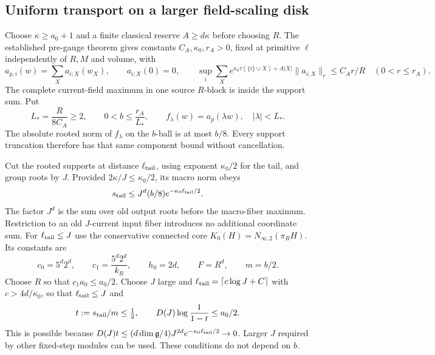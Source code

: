 \documentclass[11pt]{article}
\theoremstyle{remark}
\begin{document}
\subsection{Uniform transport on a larger field-scaling disk}
\label{cdh-scaling-section}

Choose $\kappa\geq a_0+1$ and a finite classical reserve
$A\geq d\kappa$ before choosing $R$. The established pre-gauge
theorem gives constants $C_A,\kappa_0,r_A>0$, fixed at primitive
$\ell$ independently of $R,M$ and volume, with
\begin{equation}
 a_{p,i}(w)=\sum_Xa_{i;X}(w_X),\qquad a_{i;X}(0)=0,\qquad
 \sup_i\sum_Xe^{\kappa_0\tau(\{i\}\cup X)+A|X|}
                   \|a_{i;X}\|_r\leq C_A r/R
 \quad(0<r\leq r_A).
 \label{cdh-ap-input}
\end{equation}
The complete current-field maximum in one source $R$-block is
inside the support sum. Put
\begin{equation}
 L_*=\frac{R}{8C_A}\geq2,\qquad
 0<b\leq\frac{r_A}{L_*},\qquad
 f_\lambda(w)=a_p(\lambda w),\quad |\lambda|<L_*.
 \label{cdh-scaling}
\end{equation}
The absolute rooted norm of $f_\lambda$ on the $b$-ball is at
most $b/8$. Every support truncation therefore has that same
component bound without cancellation.

Cut the rooted supports at distance $\ell_{\rm tail}$, using
exponent $\kappa_0/2$ for the tail, and group roots by $J$.
Provided $2\kappa/J\leq\kappa_0/2$, its macro norm obeys
\begin{equation}
 s_{\rm tail}\leq J^d(b/8)e^{-\kappa_0\ell_{\rm tail}/2}.
 \label{cdh-tail}
\end{equation}
The factor $J^d$ is the sum over old output roots before the
macro-fiber maximum. Restriction to an old $J$-current input
fiber introduces no additional coordinate sum.
For $\ell_{\rm tail}\leq J$ use the conservative connected core
$K_0(H)=N_{\infty,2}(\pi_RH)$. Its constants are
\begin{equation}
 c_0=5^d2^d,\qquad c_1=\frac{5^d2^d}{k_R},\qquad
 h_0=2d,\qquad F=R^d,\qquad m=b/2.
 \label{cdh-core-constants}
\end{equation}
Choose $R$ so that $c_1a_0\leq a_0/2$.
Choose $J$ large and
$\ell_{\rm tail}=\lceil c\log J+C\rceil$ with
$c>4d/\kappa_0$, so that $\ell_{\rm tail}\leq J$ and
\begin{equation}
 t:=s_{\rm tail}/m\leq\tfrac12,\qquad
 D(J)\log\frac1{1-t}\leq a_0/2.
 \label{cdh-tail-budget}
\end{equation}
This is possible because
$D(J)t\leq(d\dim\mathfrak g/4)J^{2d}
e^{-\kappa_0\ell_{\rm tail}/2}\to0$.
Larger $J$ required by other fixed-step modules can be used.
These conditions do not depend on $b$.
\end{document}
